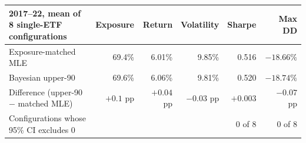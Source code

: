 \begin{tabular}{lrrrrr}\toprule
2017--22, mean of 8 single-ETF configurations & Exposure & Return & Volatility & Sharpe & Max DD\\\midrule
Exposure-matched MLE & 69.4\% & 6.01\% & 9.85\% & 0.516 & $-18.66\%$ \\
Bayesian upper-90 & 69.6\% & 6.06\% & 9.81\% & 0.520 & $-18.74\%$ \\
\midrule
Difference (upper-90 $-$ matched MLE) & $+0.1$ pp & $+0.04$ pp & $-0.03$ pp & $+0.003$ & $-0.07$ pp \\
Configurations whose 95\% CI excludes 0 & & & & 0 of 8 & 0 of 8 \\
\bottomrule\end{tabular}
